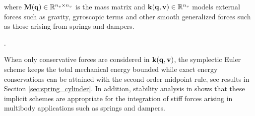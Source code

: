 where ${\mathbf{M}}({\mathbf{q}})\in\mathbb{R}^{n_v\times n_v}$ is the mass matrix and
${\mathbf{k}}({\mathbf{q}},{\mathbf{v}})\in\mathbb{R}^{n_v}$ models external forces such as
gravity, gyroscopic terms and other smooth generalized forces such as those
arising from springs and dampers.

.

When only conservative forces are considered in
${\mathbf{k}}({\mathbf{q}},{\mathbf{v}})$, the symplectic Euler scheme keeps the total mechanical
energy bounded while exact energy conservations can be attained with the second
order midpoint rule, see results in Section \ref{sec:spring_cylinder}. In
addition, stability analysis in \cite{bib:anitescu2002,bib:potra2006linearly}
shows that these implicit schemes are appropriate for the integration of stiff
forces arising in multibody applications such as springs and dampers.
